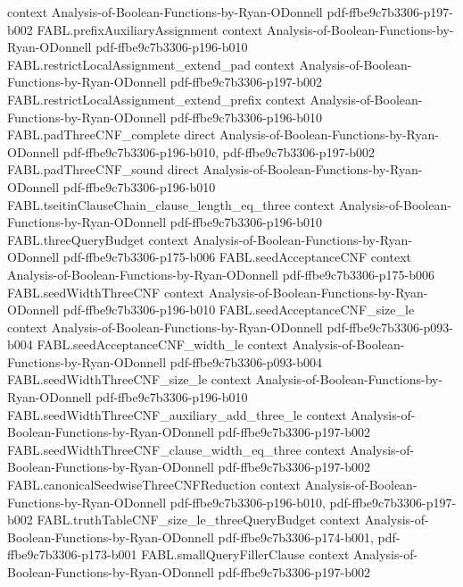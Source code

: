 \begin{theorem}
  {context}
  {Analysis-of-Boolean-Functions-by-Ryan-ODonnell}
  {pdf-ffbe9c7b3306-p197-b002}
\proofstep
  {FABL.prefixAuxiliaryAssignment}
  {context}
  {Analysis-of-Boolean-Functions-by-Ryan-ODonnell}
  {pdf-ffbe9c7b3306-p196-b010}
\proofstep
  {FABL.restrictLocalAssignment_extend_pad}
  {context}
  {Analysis-of-Boolean-Functions-by-Ryan-ODonnell}
  {pdf-ffbe9c7b3306-p197-b002}
\proofstep
  {FABL.restrictLocalAssignment_extend_prefix}
  {context}
  {Analysis-of-Boolean-Functions-by-Ryan-ODonnell}
  {pdf-ffbe9c7b3306-p196-b010}
\proofstep
  {FABL.padThreeCNF_complete}
  {direct}
  {Analysis-of-Boolean-Functions-by-Ryan-ODonnell}
  {pdf-ffbe9c7b3306-p196-b010,
    pdf-ffbe9c7b3306-p197-b002}
\proofstep
  {FABL.padThreeCNF_sound}
  {direct}
  {Analysis-of-Boolean-Functions-by-Ryan-ODonnell}
  {pdf-ffbe9c7b3306-p196-b010}
\proofstep
  {FABL.tseitinClauseChain_clause_length_eq_three}
  {context}
  {Analysis-of-Boolean-Functions-by-Ryan-ODonnell}
  {pdf-ffbe9c7b3306-p196-b010}
\proofstep
  {FABL.threeQueryBudget}
  {context}
  {Analysis-of-Boolean-Functions-by-Ryan-ODonnell}
  {pdf-ffbe9c7b3306-p175-b006}
\proofstep
  {FABL.seedAcceptanceCNF}
  {context}
  {Analysis-of-Boolean-Functions-by-Ryan-ODonnell}
  {pdf-ffbe9c7b3306-p175-b006}
\proofstep
  {FABL.seedWidthThreeCNF}
  {context}
  {Analysis-of-Boolean-Functions-by-Ryan-ODonnell}
  {pdf-ffbe9c7b3306-p196-b010}
\proofstep
  {FABL.seedAcceptanceCNF_size_le}
  {context}
  {Analysis-of-Boolean-Functions-by-Ryan-ODonnell}
  {pdf-ffbe9c7b3306-p093-b004}
\proofstep
  {FABL.seedAcceptanceCNF_width_le}
  {context}
  {Analysis-of-Boolean-Functions-by-Ryan-ODonnell}
  {pdf-ffbe9c7b3306-p093-b004}
\proofstep
  {FABL.seedWidthThreeCNF_size_le}
  {context}
  {Analysis-of-Boolean-Functions-by-Ryan-ODonnell}
  {pdf-ffbe9c7b3306-p196-b010}
\proofstep
  {FABL.seedWidthThreeCNF_auxiliary_add_three_le}
  {context}
  {Analysis-of-Boolean-Functions-by-Ryan-ODonnell}
  {pdf-ffbe9c7b3306-p197-b002}
\proofstep
  {FABL.seedWidthThreeCNF_clause_width_eq_three}
  {context}
  {Analysis-of-Boolean-Functions-by-Ryan-ODonnell}
  {pdf-ffbe9c7b3306-p197-b002}
\proofstep
  {FABL.canonicalSeedwiseThreeCNFReduction}
  {context}
  {Analysis-of-Boolean-Functions-by-Ryan-ODonnell}
  {pdf-ffbe9c7b3306-p196-b010,
    pdf-ffbe9c7b3306-p197-b002}
\proofstep
  {FABL.truthTableCNF_size_le_threeQueryBudget}
  {context}
  {Analysis-of-Boolean-Functions-by-Ryan-ODonnell}
  {pdf-ffbe9c7b3306-p174-b001,
    pdf-ffbe9c7b3306-p173-b001}
\proofstep
  {FABL.smallQueryFillerClause}
  {context}
  {Analysis-of-Boolean-Functions-by-Ryan-ODonnell}
  {pdf-ffbe9c7b3306-p197-b002}

\end{theorem}
